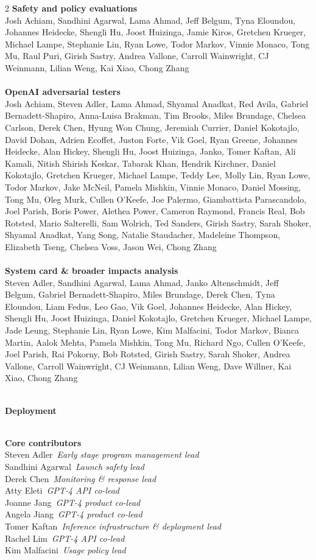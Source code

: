 \documentclass{article}
\newcommand{\creditsectionheader}[1]{\parbox{\columnwidth}{\centering \textbf{\small #1}}\\}
\newcommand{\creditlistheader}[1]{\textbf{#1}\footnotemark[\thefootnote]\\}
\newcommand{\creditlist}[2]{\creditlistheader{#1}#2\\
\\}
\newcommand{\corecontributor}[2]{#1\ \textit{#2}\\}
\begin{document}
\begin{multicols}{2}
\creditlist{Safety and policy evaluations}{Josh Achiam, Sandhini Agarwal, Lama Ahmad, Jeff Belgum, Tyna Eloundou, Johannes Heidecke, Shengli Hu, Joost Huizinga, Jamie Kiros, Gretchen Krueger, Michael Lampe, Stephanie Lin, Ryan Lowe, Todor Markov, Vinnie Monaco, Tong Mu, Raul Puri, Girish Sastry, Andrea Vallone, Carroll Wainwright, CJ Weinmann, Lilian Weng, Kai Xiao, Chong Zhang}
\creditlist{OpenAI adversarial testers}{Josh Achiam, Steven Adler, Lama Ahmad, Shyamal Anadkat, Red Avila, Gabriel Bernadett-Shapiro, Anna-Luisa Brakman, Tim Brooks, Miles Brundage, Chelsea Carlson, Derek Chen, Hyung Won Chung, Jeremiah Currier, Daniel Kokotajlo, David Dohan, Adrien Ecoffet, Juston Forte, Vik Goel, Ryan Greene, Johannes Heidecke, Alan Hickey, Shengli Hu, Joost Huizinga, Janko, Tomer Kaftan, Ali Kamali, Nitish Shirish Keskar, Tabarak Khan, Hendrik Kirchner, Daniel Kokotajlo, Gretchen Krueger, Michael Lampe, Teddy Lee, Molly Lin, Ryan Lowe, Todor Markov, Jake McNeil, Pamela Mishkin, Vinnie Monaco, Daniel Mossing, Tong Mu, Oleg Murk, Cullen O'Keefe, Joe Palermo, Giambattista Parascandolo, Joel Parish, Boris Power, Alethea Power, Cameron Raymond, Francis Real, Bob Rotsted, Mario Salterelli, Sam Wolrich, Ted Sanders, Girish Sastry, Sarah Shoker, Shyamal Anadkat, Yang Song, Natalie Staudacher, Madeleine Thompson, Elizabeth Tseng, Chelsea Voss, Jason Wei, Chong Zhang}
\creditlist{System card \& broader impacts analysis}{Steven Adler, Sandhini Agarwal, Lama Ahmad, Janko Altenschmidt, Jeff Belgum, Gabriel Bernadett-Shapiro, Miles Brundage, Derek Chen, Tyna Eloundou, Liam Fedus, Leo Gao, Vik Goel, Johannes Heidecke, Alan Hickey, Shengli Hu, Joost Huizinga, Daniel Kokotajlo, Gretchen Krueger, Michael Lampe, Jade Leung, Stephanie Lin, Ryan Lowe, Kim Malfacini, Todor Markov, Bianca Martin, Aalok Mehta, Pamela Mishkin, Tong Mu, Richard Ngo, Cullen O'Keefe, Joel Parish, Rai Pokorny, Bob Rotsted, Girish Sastry, Sarah Shoker, Andrea Vallone, Carroll Wainwright, CJ Weinmann, Lilian Weng, Dave Willner, Kai Xiao, Chong Zhang}
\creditsectionheader{Deployment}
\creditlistheader{Core contributors}
\corecontributor{Steven Adler}{Early stage program management lead}
\corecontributor{Sandhini Agarwal}{Launch safety lead}
\corecontributor{Derek Chen}{Monitoring \& response lead}
\corecontributor{Atty Eleti}{GPT-4 API co-lead}
\corecontributor{Joanne Jang}{GPT-4 product co-lead}
\corecontributor{Angela Jiang}{GPT-4 product co-lead}
\corecontributor{Tomer Kaftan}{Inference infrastructure \& deployment lead}
\corecontributor{Rachel Lim}{GPT-4 API co-lead}
\corecontributor{Kim Malfacini}{Usage policy lead}

\end{multicols}
\end{document}
